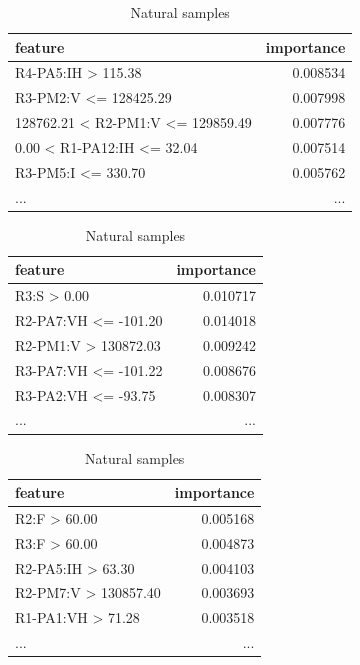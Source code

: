 \begin{table}[H]
    \footnotesize
    \centering
    \caption{5 most important features by class for Decision Tree classifier} \label{tab:5best_dt}
    \begin{subtable}[t]{0.5\linewidth}
        \centering
        \caption{NoEvents samples} 
        \begin{tabular}{lr}\toprule
            feature  &importance\\\midrule            
            R4-PA5:IH > 115.38                  & 0.008534\\
            R3-PM2:V <= 128425.29               & 0.007998\\
            128762.21 < R2-PM1:V <= 129859.49   & 0.007776\\
            0.00 < R1-PA12:IH <= 32.04          & 0.007514\\
            R3-PM5:I <= 330.70                  & 0.005762\\
            ...                                 & ... \\\bottomrule
        \end{tabular}
    \end{subtable}%
    \begin{subtable}[t]{0.5\linewidth}
        \centering
        \caption{Attack samples} 
        \begin{tabular}{lr}\toprule
            feature                   & importance \\\midrule
            R3:S > 0.00                    & 0.010717  \\
            R2-PA7:VH <= -101.20           & 0.014018   \\
            R2-PM1:V > 130872.03           & 0.009242 \\
            R3-PA7:VH <= -101.22           & 0.008676 \\
            R3-PA2:VH <= -93.75            & 0.008307 \\
            ...                            & ... \\\bottomrule
        \end{tabular}
    \end{subtable}
    \begin{subtable}[b]{0.5\linewidth}
        \centering\vspace*{.5cm}
        \caption{Natural samples} 
        \begin{tabular}{lr}\toprule
            feature                & importance   \\\midrule    
            R2:F > 60.00           &  0.005168 \\
            R3:F > 60.00           &  0.004873 \\
            R2-PA5:IH > 63.30      &  0.004103 \\
            R2-PM7:V > 130857.40   &  0.003693 \\
            R1-PA1:VH > 71.28     &   0.003518 \\
            ...                    &       ...    \\\bottomrule
        \end{tabular}
    \end{subtable}
\end{table}

